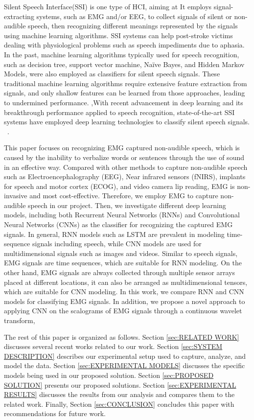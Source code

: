 \documentclass{article}
\begin{document}
Silent Speech Interface(SSI) is one type of HCI, aiming at It employs signal-extracting systems, such as EMG and/or EEG, to collect signals of silent or non-audible speech, then recognizing different meanings represented by the signals using machine learning algorithms. SSI systems can help post-stroke victims dealing with physiological problems such as speech impediments due to aphasia. In the past, machine learning algorithms typically used for speech recognition, such as decision tree, support vector machine, Naïve Bayes, and Hidden Markov Models, were also employed as classifiers for silent speech signals. These traditional machine learning algorithms require extensive feature extraction from signals, and only shallow features can be learned from those approaches, leading to undermined performance. ,With recent advancement in deep learning and its breakthrough performance applied to speech recognition, state-of-the-art SSI systems have employed deep learning  technologies to classify silent speech signals. ~\cite{wang_deep_2017}.

This paper focuses on recognizing EMG captured non-audible speech, which is caused by the inability to verbalize words or sentences through the use of sound in an effective way. Compared with other methods to capture non-audible speech such as Electroencephalography (EEG), Near infrared sensors (fNIRS), implants for speech and motor cortex (ECOG), and video camera lip reading, EMG is non-invasive and most cost-effective. Therefore, we employ EMG to capture non-audible speech in our project. Then, we investigate different deep learning models, including both Recurrent Neural Networks (RNNs) and Convolutional Neural Networks (CNNs) as the classifier for recognizing the captured EMG signals. In general, RNN models such as LSTM are prevalent in modeling time-sequence signals including speech, while CNN models are used for multidimensional signals such as images and videos. Similar to speech signals, EMG signals are time sequences, which are suitable for RNN modeling. On the other hand, EMG signals are always collected through multiple sensor arrays  placed at different locations, it can also be arranged as multidimensional tensors, which are suitable for CNN modeling.  In this work, we compare RNN and CNN models for classifying EMG signals. In addition, we propose a novel approach to applying CNN on the scalograms of EMG signals through a continuous wavelet transform,  

The rest of this paper is organized as follows. Section \ref{sec:RELATED WORK} discusses several recent works related to our work. Section \ref{sec:SYSTEM DESCRIPTION} describes our experimental setup used to capture, analyze, and model the data. Section \ref{sec:EXPERIMENTAL MODELS}  discusses the specific models being used in our proposed solution. Section \ref{sec:PROPOSED SOLUTION}  presents our proposed solutions. Section \ref{sec:EXPERIMENTAL RESULTS} discusses the results from our analysis and compares them to the related work. Finally, Section \ref{sec:CONCLUSION} concludes this paper with recommendations for future work.
\end{document}
